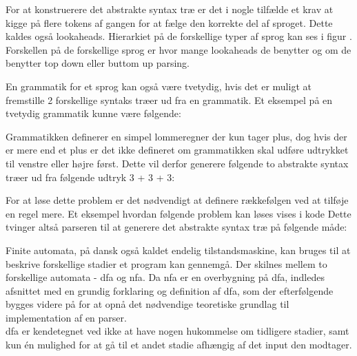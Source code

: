 For at konstruerere det abstrakte syntax træ er det i nogle tilfælde et krav at kigge på flere tokens af gangen for at fælge den korrekte del af sproget. Dette kaldes også lookaheads. Hierarkiet på de forskellige typer af sprog kan ses i figur . Forskellen på de forskellige sprog er hvor mange lookaheads de benytter og om de benytter top down eller buttom up parsing.




\noindent En grammatik for et sprog kan også være tvetydig, hvis det er muligt at fremstille 2 forskellige syntaks træer ud fra en grammatik. Et eksempel på en tvetydig grammatik kunne være følgende:




\noindent Grammatikken definerer en simpel lommeregner der kun tager plus, dog hvis der er mere end et plus er det ikke defineret om grammatikken skal udføre udtrykket til venstre eller højre først. Dette vil derfor generere følgende to abstrakte syntax træer ud fra følgende udtryk 3 + 3 + 3: 

\noindent For at løse dette problem er det nødvendigt at definere rækkefølgen ved at tilføje en regel mere. Et eksempel hvordan følgende problem kan løses vises i kode 
Dette tvinger altså parseren til at generere det abstrakte syntax træ på følgende måde:

Finite automata, på dansk også kaldet endelig tilstandsmaskine, kan bruges til at beskrive forskellige stadier et program kan gennemgå. Der skilnes mellem to forskellige automata - \gls{dfa} og \gls{nfa}. Da \gls{nfa} er en overbygning på \gls{dfa}, indledes afsnittet med en grundig forklaring og definition af \gls{dfa}, som der efterfølgende bygges videre på for at opnå det nødvendige teoretiske grundlag til implementation af en parser.\\

\noindent \gls{dfa} er kendetegnet ved ikke at have nogen hukommelse om tidligere stadier, samt kun én mulighed for at gå til et andet stadie afhængig af det input den modtager.

